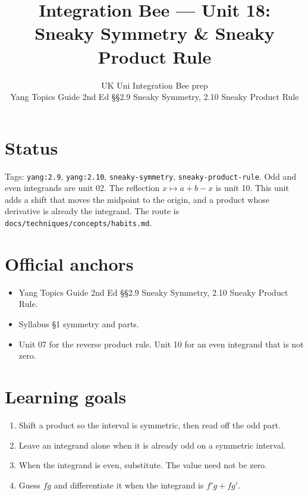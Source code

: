 
\title{Integration Bee --- Unit 18:\\ Sneaky Symmetry \& Sneaky Product Rule}
\author{UK Uni Integration Bee prep\\ Yang Topics Guide 2nd Ed §§2.9 Sneaky Symmetry, 2.10 Sneaky Product Rule}
\date{}

\maketitle

\section*{Status}
Tags: \texttt{yang:2.9}, \texttt{yang:2.10}, \texttt{sneaky-symmetry}, \texttt{sneaky-product-rule}.
Odd and even integrands are unit 02. The reflection $x\mapsto a+b-x$ is unit 10. This unit adds a shift that moves the midpoint to the origin, and a product whose derivative is already the integrand. The route is \texttt{docs/techniques/concepts/habits.md}.

\section{Official anchors}
\begin{itemize}
  \item Yang Topics Guide 2nd Ed §§2.9 Sneaky Symmetry, 2.10 Sneaky Product Rule.
  \item Syllabus §1 symmetry and parts.
  \item Unit 07 for the reverse product rule. Unit 10 for an even integrand that is not zero.
\end{itemize}

\section{Learning goals}
\begin{enumerate}
  \item Shift a product so the interval is symmetric, then read off the odd part.
  \item Leave an integrand alone when it is already odd on a symmetric interval.
  \item When the integrand is even, substitute. The value need not be zero.
  \item Guess $fg$ and differentiate it when the integrand is $f'g+fg'$.
\end{enumerate}

